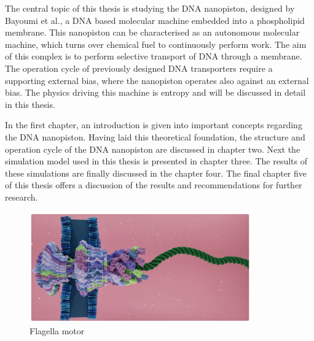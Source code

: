 The central topic of this thesis is studying the DNA nanopiston, designed by Bayoumi et
al., a DNA based molecular machine embedded into a phospholipid membrane. This nanopiston
can
be characterised as an autonomous molecular machine, which turns over chemical fuel to
continuously perform work. The aim of this complex is to perform selective transport of
DNA through a membrane. The operation cycle of previously designed DNA transporters
require a supporting external bias, where the nanopiston operates also against an
external bias. The physics driving this machine is entropy and will be discussed in
detail in this thesis.

In the first chapter, an introduction is given into important concepts regarding the
DNA nanopiston. Having laid this theoretical foundation, the structure and operation
cycle of the DNA nanopiston are discussed in chapter two. Next the simulation model used
in this thesis is presented in chapter three. The results of these simulations are
finally discussed in the chapter four. The final chapter five of this thesis offers a
discussion of the results and recommendations for further research.

\begin{figure}[ht]
\begin{center}
  \includegraphics[width=0.85\textwidth]{Figures/flagella2.png}
  \caption{Flagella motor}
\end{center}
\end{figure}
